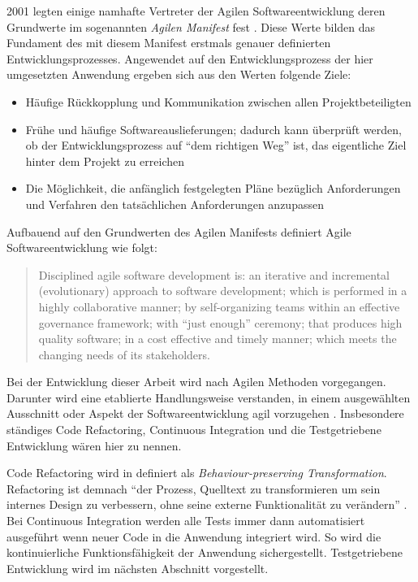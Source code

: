 2001 legten einige namhafte Vertreter der Agilen Softwareentwicklung deren Grundwerte im sogenannten \textit{Agilen Manifest} fest \cite{agile:manifesto}. Diese Werte bilden das Fundament des mit diesem Manifest erstmals genauer definierten Entwicklungsprozesses. Angewendet auf den Entwicklungsprozess der hier umgesetzten Anwendung ergeben sich aus den Werten folgende Ziele:

\begin{itemize}
  \item Häufige Rückkopplung und Kommunikation zwischen allen Projektbeteiligten
  \item Frühe und häufige Softwareauslieferungen; dadurch kann überprüft werden, ob der Entwicklungsprozess auf \enquote{dem richtigen Weg} ist, das eigentliche Ziel hinter dem Projekt zu erreichen
  \item Die Möglichkeit, die anfänglich festgelegten Pläne bezüglich Anforderungen und Verfahren den tatsächlichen Anforderungen anzupassen
\end{itemize}

Aufbauend auf den Grundwerten des Agilen Manifests definiert \cite{agile:definition} Agile Softwareentwicklung wie folgt:

\begin{quote}
Disciplined agile software development is: an iterative and incremental (evolutionary) approach to software development; which is performed in a highly collaborative manner; by self-organizing teams within an effective governance framework; with \enquote{just enough} ceremony; that produces high quality software; in a cost effective and timely manner; which meets the changing needs of its stakeholders. 
\end{quote}

Bei der Entwicklung dieser Arbeit wird nach Agilen Methoden vorgegangen. Darunter wird eine etablierte Handlungsweise verstanden, in einem ausgewählten Ausschnitt oder Aspekt der Softwareentwicklung agil vorzugehen . Insbesondere ständiges Code Refactoring, Continuous Integration und die Testgetriebene Entwicklung wären hier zu nennen.

Code Refactoring wird in  definiert als \textit{Behaviour-preserving Transformation}. Refactoring ist demnach \enquote{der Prozess, Quelltext zu transformieren um sein internes Design zu verbessern, ohne seine externe Funktionalität zu verändern} . Bei Continuous Integration werden alle Tests immer dann automatisiert ausgeführt wenn neuer Code in die Anwendung integriert wird. So wird die kontinuierliche Funktionsfähigkeit der Anwendung sichergestellt. Testgetriebene Entwicklung wird im nächsten Abschnitt vorgestellt.




